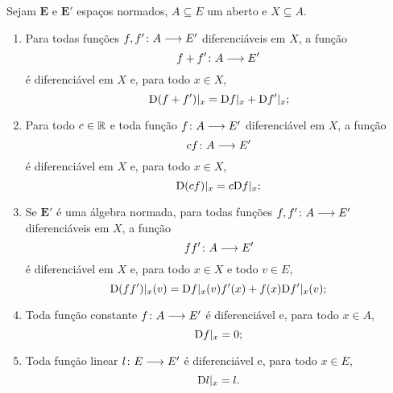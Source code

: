 \begin{proposition}
\label{prop:diferencial.propriedades}
Sejam $\bm E$ e $\bm E'$ espaços normados, $A \subseteq E$ um aberto e $X \subseteq A$.
	\begin{enumerate}
	\item Para todas funções ${f,f'}\colon {A} \longrightarrow {E'}$ diferenciáveis em $X$, a função
		\begin{equation*}
		{f+f'}\colon {A} \longrightarrow {E'}
		\end{equation*}
	é diferenciável em $X$ e, para todo $x \in X$,
		\begin{equation*}
		\mathrm{D} (f+f')|_x = \mathrm{D} f|_x + \mathrm{D} f'|_x;
		\end{equation*}
	\item Para todo $c \in \mathbb{R}$ e toda função ${f}\colon {A} \longrightarrow {E'}$ diferenciável em $X$, a função
		\begin{equation*}
		{c f}\colon {A} \longrightarrow {E'}
		\end{equation*}
	é diferenciável em $X$ e, para todo $x \in X$,
		\begin{equation*}
		\mathrm{D} (c f)|_x = c\mathrm{D} f|_x;
		\end{equation*}
	\item Se $\bm E'$ é uma álgebra normada, para todas funções ${f,f'}\colon {A} \longrightarrow {E'}$ diferenciáveis em $X$, a função
		\begin{equation*}
		{f f'}\colon {A} \longrightarrow {E'}
		\end{equation*}
	é diferenciável em $X$ e, para todo $x \in X$ e todo $v \in E$,
		\begin{equation*}
		\mathrm{D} (f f')|_x(v) = \mathrm{D} f|_x(v)f'(x) + f(x)\mathrm{D} f'|_x(v);
		\end{equation*}
	\item Toda função constante ${f}\colon {A} \longrightarrow {E'}$ é diferenciável e, para todo $x \in A$,
		\begin{equation*}
		\mathrm{D} f|_x = 0;
		\end{equation*}
	\item Toda função linear ${l}\colon {E} \longrightarrow {E'}$ é diferenciável e, para todo $x \in E$,
		\begin{equation*}
		\mathrm{D} l|_x = l.
		\end{equation*}
	\end{enumerate}
\end{proposition}
